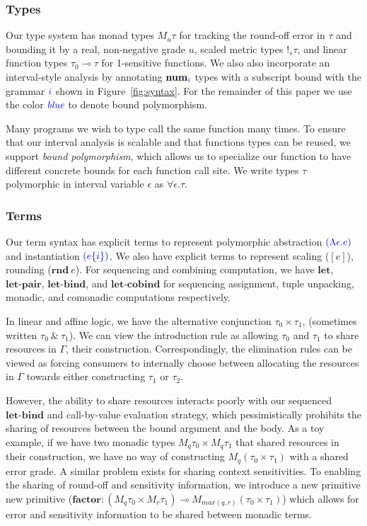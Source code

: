 \subsubsection*{Types} 
Our type system has monad types $M_u \tau$ for tracking the round-off error in
$\tau$ and bounding it by a real, non-negative grade $u$, scaled metric types
$!_s \tau$, and linear function types $\tau_0 \multimap \tau$ for 1-sensitive
functions. We also also incorporate an interval-style analysis by annotating
$\textbf{num}_{\textcolor{blue}{i}}$ types with a subscript bound with the grammar $\textcolor{blue}{i}$
shown in Figure~\ref{fig:syntax}. For the remainder of this paper we use the
color $\textcolor{blue}{\textit{blue}}$ to denote bound polymorphism.

Many programs we wish to type call the same function many times. To ensure that
our interval analysis is scalable and that functions types can be reused, we
support \textit{bound polymorphism}, which allows us to specialize our function
to have different concrete bounds for each function call site. We write types
$\tau$ polymorphic in interval variable $\epsilon$ as $\forall \epsilon. \tau$.

\subsubsection*{Terms}
Our term syntax has explicit terms to represent polymorphic abstraction
$\textcolor{blue}{(\Lambda \epsilon. e)}$ and instantiation $\textcolor{blue}{(e \{i\})}$. We also have
explicit terms to represent scaling ($[e]$), rounding ($\textbf{rnd}~e$).
For sequencing and combining computation, we have $\textbf{let}$,
$\textbf{let-pair}$, $\textbf{let-bind}$, and $\textbf{let-cobind}$ for
sequencing assignment, tuple unpacking, monadic, and comonadic computations
respectively.

In linear and affine logic, we have the alternative conjunction $\tau_0 \times
\tau_1$, (sometimes written $\tau_0~\&~\tau_1$). We can view the introduction
rule as allowing $\tau_0$ and $\tau_1$ to share resources in $\Gamma$, their
construction. Correspondingly, the elimination rules can be viewed as forcing
consumers to internally choose between allocating the resources in $\Gamma$
towards either constructing $\tau_1$ or $\tau_2$.

However, the ability to share resources interacts poorly with our sequenced
$\textbf{let-bind}$ and call-by-value evaluation strategy, which pessimistically
prohibits the sharing of resources between the bound argument and the body. As a
toy example, if we have two monadic types $M_q \tau_0 \times M_q \tau_1$ that
shared resources in their construction, we have no way of constructing $M_q
(\tau_0 \times \tau_1)$ with a shared error grade. A similar problem exists for
sharing context sensitivities. To enabling the sharing of round-off and
sensitivity information, we introduce a new primitive new primitive
($\textbf{factor} : (M_q \tau_0 \times M_r \tau_1) \multimap M_{max(q, r)}
(\tau_0 \times \tau_1)$) which allows for error and sensitivity information to
be shared between monadic terms.


